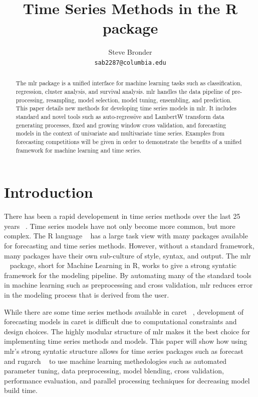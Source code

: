 \documentclass{article}\usepackage[]{graphicx}\usepackage[]{color}
\title{Time Series Methods in the R package \pkg{mlr}}
\author{
  Steve Bronder \\
  \texttt{sab2287@columbia.edu} \\
}
\theoremstyle{definition}
\let\proglang=\textsf
\newcommand{\pkg}[1]{{\fontseries{b}\selectfont #1}}
\begin{document}

\maketitle

\begin{abstract}
The \pkg{mlr} package is a unified interface for machine learning tasks such as classification, regression, cluster analysis, and survival analysis. \pkg{mlr} handles the data pipeline of pre-processing, resampling, model selection, model tuning, ensembling, and prediction. This paper details new methods for developing time series  models in \pkg{mlr}. It includes standard and novel tools such as auto-regressive and LambertW transform data generating processes, fixed and growing window cross validation, and forecasting models in the context of univariate and multivariate time series. Examples from forecasting competitions will be given in order to demonstrate the benefits of a unified framework for machine learning and time series.
  \end{abstract}

\section{Introduction}
There has been a rapid developement in time series methods over the last 25 years ~\cite{Hyndman25}. Time series models have not only become more common, but more complex. The \proglang{R} language ~\cite{Rbase} has a large task view with many packages available for forecasting and time series methods. However, without a standard framework, many packages have their own sub-culture of style, syntax, and output. The \pkg{mlr} ~\cite{mlr} package, short for Machine Learning in R, works to give a strong syntatic framework for the modeling pipeline. By automating many of the standard tools in machine learning such as preprocessing and cross validation, \pkg{mlr} reduces error in the modeling process that is derived from the user. 

While there are some time series methods available in \pkg{caret} ~\cite{caret}, development of forecasting models in \pkg{caret} is difficult due to computational constraints and design choices. The highly modular structure of \pkg{mlr} makes it the best choice for implementing time series methods and models. This paper will show how using \pkg{mlr}'s strong syntatic structure allows for time series packages such as \pkg{forecast} ~\cite{HyndForecast} and \pkg{rugarch} ~\cite{rugarch} to use machine learning methedologies such as automated parameter tuning, data preprocessing, model blending, cross validation, performance evaluation, and parallel processing techniques for decreasing model build time.
\end{document}
